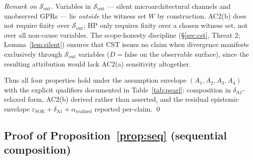 \documentclass[conference]{IEEEtran}
\newcommand{\arealized}{\alpha_\text{realized}}
\newcommand{\epsSOE}{\varepsilon_\text{SOE}}
\begin{document}
\emph{Remark on $\mathcal{S}_\text{out}$.} Variables in
$\mathcal{S}_\text{out}$ --- silent microarchitectural channels
and unobserved GPRs --- lie \emph{outside} the witness set $W$
by construction. AC2(b) does not require fixity over
$\mathcal{S}_\text{out}$; HP only requires fixity over a chosen
witness set, not over all non-cause variables. The scope-honesty
discipline (\S\ref{sec:cst}, Threat 2; Lemma~\ref{lem:silent})
ensures that CST issues no claim when divergence manifests
exclusively through $\mathcal{S}_\text{out}$ variables
($D = \text{false}$ on the observable surface), since the
resulting attribution would lack AC2(a) sensitivity altogether.

Thus all four properties hold under the assumption envelope
$(A_1, A_2, A_3, A_4)$ with the explicit qualifiers documented in
Table~\ref{tab:pearl}: composition in $\delta_{\text{A1}}$-relaxed
form, AC2(b) derived rather than asserted, and the residual
epistemic envelope $\epsSOE + \delta_{\text{A1}} + \arealized$
reported per-claim. \qed

\subsection{Proof of Proposition~\ref{prop:seq} (sequential composition)}
\end{document}
